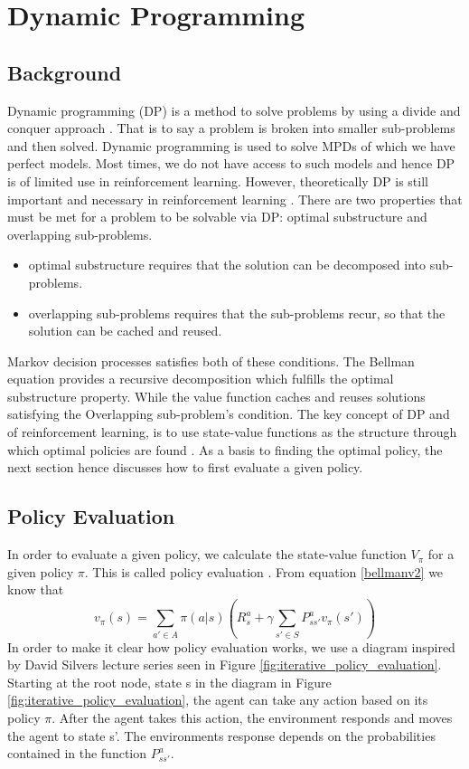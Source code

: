\graphicspath{{Dynamic\_Programming/fig/}}

\chapter{Dynamic Programming}
\label{chap:Dynamic_Programming}

\section{Background}

Dynamic programming (DP) is a method to solve problems by using a divide and conquer approach \cite{David_Silver}. That is to say a problem is broken into smaller sub-problems and then solved. Dynamic programming is used to solve MPDs of which we have perfect models. Most times, we do not have access to such models and hence DP is of limited use in reinforcement learning. However, theoretically DP is still important and necessary in reinforcement learning \cite{sutton_barto}.
There are two properties that must be met for a problem to be solvable via DP: optimal substructure and overlapping sub-problems. \cite{David_Silver}
\begin{itemize}
	\item optimal substructure requires that the solution can be decomposed into sub-problems.
	\item overlapping sub-problems requires that the sub-problems recur, so that the solution can be cached and reused.
\end{itemize}

Markov decision processes satisfies both of these conditions. The Bellman equation provides a recursive decomposition which fulfills the optimal substructure property. While the value function caches and reuses solutions satisfying the Overlapping sub-problem's condition. \cite{David_Silver}
The key concept of DP and of reinforcement learning, is to use state-value functions as the structure through which optimal policies are found \cite{sutton_barto}. As a basis to finding the optimal policy, the next section hence discusses how to first evaluate a given policy.
\section{Policy Evaluation}
In order to evaluate a given policy, we calculate the state-value function $V_{\pi}$ for a given policy $\pi$. This is called policy evaluation \cite{sutton_barto}.
From equation \ref{bellmanv2} we know that
\[
v_{\pi}(s) = \sum_{a'\in A}\pi(a|s)(R^{a}_s+\gamma\sum_{s'\in S}P^{a}_{ss'}v_\pi(s'))
\]
In order to make it clear how policy evaluation works, we use a diagram inspired by David Silvers lecture series \cite{David_Silver} seen in Figure \ref{fig:iterative_policy_evaluation}.
Starting at the root node, state s in the diagram in Figure \ref{fig:iterative_policy_evaluation}, the agent can take any action based on its policy $\pi$. After the agent takes this action, the environment responds and moves the agent to state s'. The environments response depends on the probabilities contained in the function $P^{a}_{ss'}$. 

